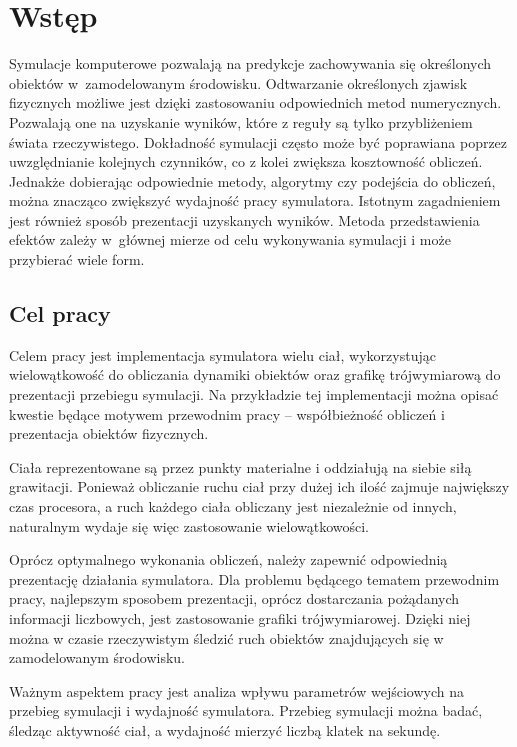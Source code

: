 \documentclass[12pt, twoside, openany]{report}
\begin{document}
\tableofcontents



\chapter{Wstęp}

Symulacje komputerowe pozwalają na predykcje zachowywania się określonych obiektów w~zamodelowanym środowisku. Odtwarzanie określonych zjawisk fizycznych możliwe jest dzięki zastosowaniu odpowiednich metod numerycznych. Pozwalają one na uzyskanie wyników, które z reguły są tylko przybliżeniem świata rzeczywistego. Dokładność symulacji często może być poprawiana poprzez uwzględnianie kolejnych czynników, co z kolei zwiększa kosztowność obliczeń. Jednakże dobierając odpowiednie metody, algorytmy czy podejścia do obliczeń, można znacząco zwiększyć wydajność pracy symulatora. Istotnym zagadnieniem jest również sposób prezentacji uzyskanych wyników. Metoda przedstawienia efektów zależy w~głównej mierze od celu wykonywania symulacji i może przybierać wiele form.

\section{Cel pracy}

Celem pracy jest implementacja symulatora wielu ciał, wykorzystując wielowątkowość do obliczania dynamiki obiektów oraz grafikę trójwymiarową do prezentacji przebiegu symulacji. Na przykładzie tej implementacji można opisać kwestie będące motywem przewodnim pracy -- współbieżność obliczeń i prezentacja obiektów fizycznych.

Ciała reprezentowane są przez punkty materialne i oddziałują na siebie siłą grawitacji. Ponieważ obliczanie ruchu ciał przy dużej ich ilość zajmuje największy czas procesora, a ruch każdego ciała obliczany jest niezależnie od innych, naturalnym wydaje się więc zastosowanie wielowątkowości.

Oprócz optymalnego wykonania obliczeń, należy zapewnić odpowiednią prezentację działania symulatora. Dla problemu będącego tematem przewodnim pracy, najlepszym sposobem prezentacji, oprócz dostarczania pożądanych informacji liczbowych, jest zastosowanie grafiki trójwymiarowej. Dzięki niej można w czasie rzeczywistym śledzić ruch obiektów znajdujących się w zamodelowanym środowisku.

Ważnym aspektem pracy jest analiza wpływu parametrów wejściowych na przebieg symulacji i wydajność symulatora. Przebieg symulacji można badać, śledząc aktywność ciał, a wydajność mierzyć liczbą klatek na sekundę.
\end{document}
